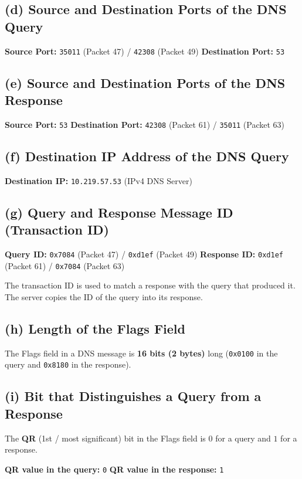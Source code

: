 \documentclass[12pt,a4paper]{article}
\begin{document}
	\subsection*{(d) Source and Destination Ports of the DNS Query}
	\textbf{Source Port:} \texttt{35011} (Packet 47) / \texttt{42308} (Packet 49) \hfill \textbf{Destination Port:} \texttt{53}
	
	\subsection*{(e) Source and Destination Ports of the DNS Response}
	\textbf{Source Port:} \texttt{53} \hfill \textbf{Destination Port:} \texttt{42308} (Packet 61) / \texttt{35011} (Packet 63)
	
	\subsection*{(f) Destination IP Address of the DNS Query}
	\textbf{Destination IP:} \texttt{10.219.57.53} (IPv4 DNS Server)
	
	\subsection*{(g) Query and Response Message ID (Transaction ID)}
	\textbf{Query ID:} \texttt{0x7084} (Packet 47) / \texttt{0xd1ef} (Packet 49) \hfill \textbf{Response ID:} \texttt{0xd1ef} (Packet 61) / \texttt{0x7084} (Packet 63)
	
	The transaction ID is used to match a response with the query that produced it. The server copies the ID of the query into its response.
	
	\subsection*{(h) Length of the Flags Field}
	The Flags field in a DNS message is \textbf{16 bits (2 bytes)} long (\texttt{0x0100} in the query and \texttt{0x8180} in the response).
	
	\subsection*{(i) Bit that Distinguishes a Query from a Response}
	The \textbf{QR} (1st / most significant) bit in the Flags field is $0$ for a query and $1$ for a response.
	
	\textbf{QR value in the query:} \texttt{0} \hfill \textbf{QR value in the response:} \texttt{1}
	
\end{document}
